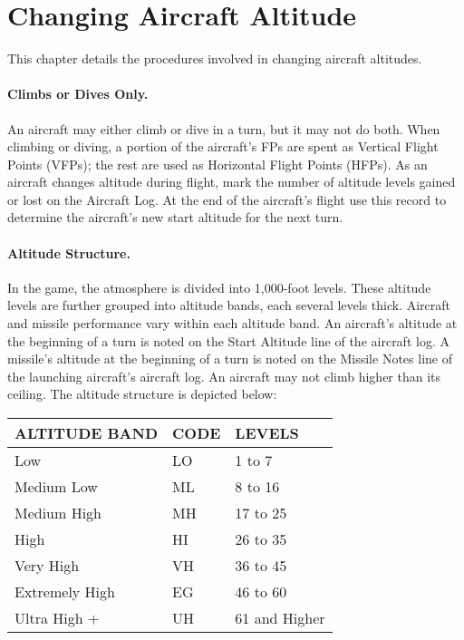 \section{Changing Aircraft Altitude}


This chapter details the procedures involved in changing aircraft altitudes.

\paragraph{Climbs or Dives Only.} An aircraft may either climb or dive in a turn, but it may not do both.  When climbing or diving, a portion of the aircraft's FPs are spent as Vertical Flight Points (VFPs); the rest are used as Horizontal Flight Points (HFPs). As an aircraft changes altitude during flight, mark the number of altitude levels gained or lost on the Aircraft Log. At the end of the aircraft's flight use this record to determine the aircraft's new start altitude for the next turn.

\paragraph{Altitude Structure.} In the game, the atmosphere is divided into 1,000-foot levels. These altitude levels are further grouped into altitude bands, each several levels thick. Aircraft and missile performance vary within each altitude band. An aircraft's altitude at the beginning of a turn is noted on the Start Altitude line of the aircraft log. A missile's altitude at the beginning of a turn is noted on the Missile Notes line of the launching aircraft's aircraft log. An aircraft may not climb higher than its ceiling. The altitude structure is depicted below:

\begin{table}[!ht]
\centering
\begin{tabular}{lll}
\hline
ALTITUDE BAND&CODE&LEVELS\\
\hline
Low             &LO &1 to 7\\
Medium Low      &ML &8 to 16\\
Medium High     &MH &17 to 25\\
High            &HI &26 to 35\\
Very High       &VH &36 to 45\\
Extremely High  &EG &46 to 60\\
Ultra High +    &UH &61 and Higher\\
\hline
\end{tabular}
\end{table}

